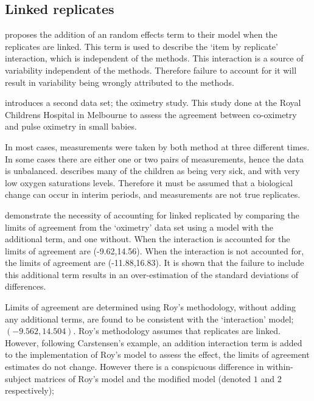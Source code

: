 \documentclass[12pt, a4paper]{report}
\theoremstyle{plain}
\theoremstyle{definition}
\theoremstyle{remark}
\begin{document}
\subsection{Linked replicates}
	
\citet{BXC2008} proposes the addition of an random effects term to their model when the replicates are linked. This term is used to describe the `item by replicate' interaction, which is independent of the methods. This interaction is a source of variability independent of the methods. Therefore failure to account for it will result in variability being wrongly attributed to the methods.
	
\citet{BXC2008} introduces a second data set; the oximetry study. This study done at the Royal Childrens Hospital in Melbourne to assess the agreement between co-oximetry and pulse oximetry in small babies.
	
In most cases, measurements were taken by both method at three different times. In some cases there are either one or two pairs of measurements, hence the data is unbalanced. \citet{BXC2008} describes many of the children as being very sick, and with very low oxygen saturations levels. Therefore it must be assumed that a biological change can occur in interim periods, and measurements are not true replicates.
	
	\citet{BXC2008} demonstrate the necessity of accounting for linked replicated by comparing the limits of agreement from the `oximetry' data set using a model with the additional term, and one without. When the interaction is accounted for the limits of agreement are (-9.62,14.56). When the interaction is not accounted for, the limits of agreement are (-11.88,16.83). It is shown that the failure to include this additional term results in an over-estimation of the standard deviations of differences.
	
	Limits of agreement are determined using Roy's methodology, without adding any additional terms, are found to be consistent with the `interaction' model; $(-9.562, 14.504 )$. Roy's methodology assumes that replicates are linked. However, following Carstensen's example, an addition interaction term is added to the implementation of Roy's model to assess the effect, the limits of agreement estimates do not change. However there is a conspicuous difference in within-subject matrices of Roy's model and the modified model (denoted $1$ and $2$ respectively);
	
\end{document}
